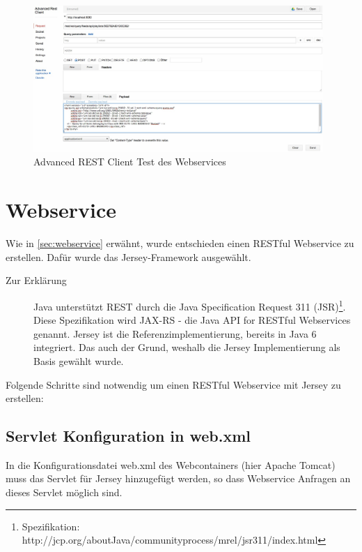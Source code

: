 \begin{figure}[htbp]
	\centering
		\includegraphics[width=0.98\textwidth]{images/advanced_rest_client_test.jpg}
	\caption{Advanced REST Client Test des Webservices}
	\label{fig:advancedrestclienttest}
\end{figure}

\section{Webservice}\label{kap:webservice}

Wie in \autoref{sec:webservice} erwähnt, wurde entschieden einen \gls{REST}ful \gls{Webservice} zu erstellen. Dafür wurde das \gls{Jersey}-Framework ausgewählt. 

\begin{description}
\item[Zur Erklärung] Java unterstützt REST durch die Java Specification Request 311 (JSR)\footnote{Spezifikation: http://jcp.org/aboutJava/communityprocess/mrel/jsr311/index.html}. Diese Spezifikation wird JAX-RS - die Java API for RESTful Webservices genannt. Jersey ist die Referenzimplementierung, bereits in Java 6 integriert. Das auch der Grund, weshalb die Jersey Implementierung als Basis gewählt wurde.  
\end{description}

Folgende Schritte sind notwendig um einen \gls{REST}ful Webservice mit Jersey zu erstellen: 

\subsection{Servlet Konfiguration in web.xml} 

In die Konfigurationsdatei web.xml des Webcontainers (hier \gls{Apache Tomcat}) muss das Servlet für \gls{Jersey} hinzugefügt werden, so dass \gls{Webservice} Anfragen an dieses Servlet möglich sind. 

